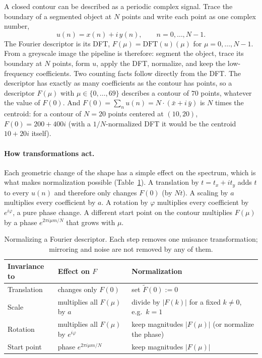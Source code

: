 A closed contour can be described as a periodic complex signal. Trace the
boundary of a segmented object at $N$ points and write each point as one
complex number,
\begin{equation}
  u(n) = x(n) + i\,y(n), \qquad n = 0,\dots,N-1 .
\end{equation}
\noindent
The Fourier descriptor is its DFT, $F(\mu) = \mathrm{DFT}(u)(\mu)$ for
$\mu = 0,\dots,N-1$. From a greyscale image the pipeline is therefore: segment the
object, trace its boundary at $N$ points, form $u$, apply the DFT, normalize,
and keep the low-frequency coefficients. Two counting facts follow directly
from the DFT. The descriptor has exactly as many coefficients as the contour has
points, so a descriptor $F(\mu)$ with $\mu\in\{0,\dots,69\}$ describes a contour
of $70$ points, whatever the value of $F(0)$. And
$F(0) = \sum_n u(n) = N\cdot(\bar x + i\,\bar y)$ is $N$ times the centroid: for
a contour of $N = 20$ points centered at $(10,20)$, $F(0) = 200 + 400i$ (with a
$1/N$-normalized DFT it would be the centroid $10 + 20i$ itself).

\paragraph{How transformations act.}
Each geometric change of the shape has a simple effect on the spectrum, which is
what makes normalization possible (Table~\ref{tab:fd-norm}). A translation by
$t = t_x + i t_y$ adds $t$ to every $u(n)$ and therefore only changes $F(0)$ (by
$Nt$). A scaling by $a$ multiplies every coefficient by $a$. A rotation by
$\varphi$ multiplies every coefficient by $e^{i\varphi}$, a pure phase change. A
different start point on the contour multiplies $F(\mu)$ by a phase
$e^{2\pi i\mu m/N}$ that grows with $\mu$.

\begin{table}[ht]
  \centering
  \begin{tabular}{@{}p{2.8cm}p{4.3cm}p{5.9cm}@{}}
    \toprule
    Invariance to & Effect on $F$ & Normalization \\
    \midrule
    Translation & changes only $F(0)$ & set $\tilde F(0) := 0$ \\
    Scale & multiplies all $F(\mu)$ by $a$ & divide by $\lvert F(k)\rvert$ for a
      fixed $k\neq 0$, e.g.\ $k=1$ \\
    Rotation & multiplies all $F(\mu)$ by $e^{i\varphi}$ & keep magnitudes
      $\lvert F(\mu)\rvert$ (or normalize the phase) \\
    Start point & phase $e^{2\pi i \mu m/N}$ & keep magnitudes
      $\lvert F(\mu)\rvert$ \\
    \bottomrule
  \end{tabular}
  \caption{Normalizing a Fourier descriptor. Each step removes one nuisance
  transformation; mirroring and noise are not removed by any of them.}
  \label{tab:fd-norm}
\end{table}

